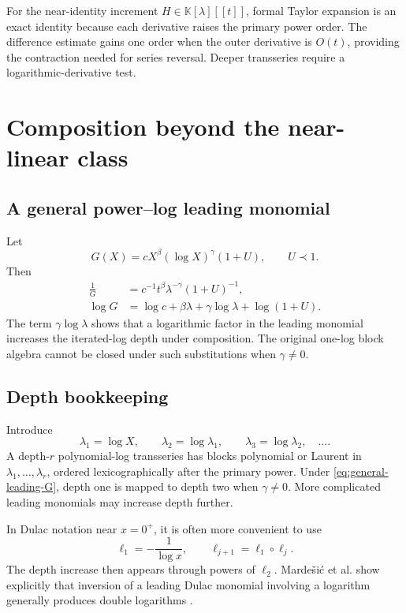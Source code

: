 \documentclass[11pt,openany]{book}
\theoremstyle{definition}
\theoremstyle{plain}
\theoremstyle{remark}
\newcommand{\K}{\mathbb{K}}
\newcommand{\precdom}{\prec}
\begin{document}
\begin{summarybox}
For the near-identity increment \(H\in\K[\lambda][[t]]\), formal Taylor expansion is an exact identity because each derivative raises the primary power order. The difference estimate gains one order when the outer derivative is \(O(t)\), providing the contraction needed for series reversal. Deeper transseries require a logarithmic-derivative test.
\end{summarybox}

\chapter{Composition beyond the near-linear class}\label{ch:composition-depth}

\section{A general power--log leading monomial}
Let
\begin{equation}\label{eq:general-leading-G}
 G(X)=cX^\beta(\log X)^\gamma(1+U),
 \qquad U\precdom1.
\end{equation}
Then
\begin{align}
 \frac1G&=c^{-1}t^\beta\lambda^{-\gamma}(1+U)^{-1},
 \label{eq:general-t-sub}\\
 \log G&=\log c+\beta\lambda+\gamma\log\lambda+\log(1+U).
 \label{eq:general-lambda-sub}
\end{align}
The term \(\gamma\log\lambda\) shows that a logarithmic factor in the leading monomial increases the iterated-log depth under composition. The original one-log block algebra cannot be closed under such substitutions when \(\gamma\ne0\).

\section{Depth bookkeeping}
Introduce
\[
 \lambda_1=\log X,
 \qquad \lambda_2=\log\lambda_1,
 \qquad \lambda_3=\log\lambda_2,
 \quad\ldots.
\]
A depth-\(r\) polynomial-log transseries has blocks polynomial or Laurent in \(\lambda_1,\ldots,\lambda_r\), ordered lexicographically after the primary power. Under \cref{eq:general-leading-G}, depth one is mapped to depth two when \(\gamma\ne0\). More complicated leading monomials may increase depth further.

In Dulac notation near \(x=0^+\), it is often more convenient to use
\[
 \ell_1=-\frac1{\log x},
 \qquad \ell_{j+1}=\ell_1\circ\ell_j.
\]
The depth increase then appears through powers of \(\ell_2\). Marde\v{s}i\'c et al. show explicitly that inversion of a leading Dulac monomial involving a logarithm generally produces double logarithms \cite{mardesic-length}.
\end{document}
